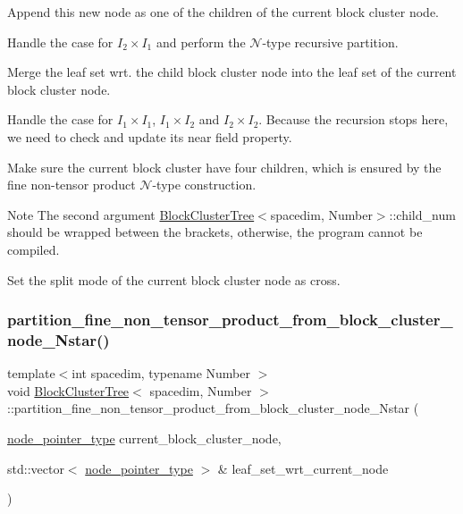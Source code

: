 Append this new node as one of the children of the current block cluster node.

Handle the case for $I_2 \times I_1$ and perform the $\mathcal{N}$-\/type recursive partition.

Merge the leaf set wrt. the child block cluster node into the leaf set of the current block cluster node.

Handle the case for $I_1 \times I_1$, $I_1 \times I_2$ and $I_2 \times I_2$. Because the recursion stops here, we need to check and update its near field property.

Make sure the current block cluster have four children, which is ensured by the fine non-\/tensor product $\mathcal{N}$-\/type construction.


\begin{DoxyDescription}
\item[Note ]The second argument {\ttfamily \hyperlink{classBlockClusterTree}{Block\+Cluster\+Tree}$<$spacedim}, Number$>$\+::child\+\_\+num should be wrapped between the brackets, otherwise, the program cannot be compiled. 
\end{DoxyDescription}

Set the split mode of the current block cluster node as cross.\mbox{\label{classBlockClusterTree_afdeb6723e01b5eaf11281e2c1c1cf566}} 
\subsubsection{\texorpdfstring{partition\+\_\+fine\+\_\+non\+\_\+tensor\+\_\+product\+\_\+from\+\_\+block\+\_\+cluster\+\_\+node\+\_\+\+Nstar()}{partition\_fine\_non\_tensor\_product\_from\_block\_cluster\_node\_Nstar()}}
{\footnotesize\ttfamily template$<$int spacedim, typename Number $>$ \\
void \hyperlink{classBlockClusterTree}{Block\+Cluster\+Tree}$<$ spacedim, Number $>$\+::partition\+\_\+fine\+\_\+non\+\_\+tensor\+\_\+product\+\_\+from\+\_\+block\+\_\+cluster\+\_\+node\+\_\+\+Nstar (\begin{DoxyParamCaption}\item[{\hyperlink{classTreeNode}{node\+\_\+pointer\+\_\+type}}]{current\+\_\+block\+\_\+cluster\+\_\+node,  }\item[{std\+::vector$<$ \hyperlink{classTreeNode}{node\+\_\+pointer\+\_\+type} $>$ \&}]{leaf\+\_\+set\+\_\+wrt\+\_\+current\+\_\+node }\end{DoxyParamCaption})\hspace{0.3cm}{\ttfamily [private]}}

